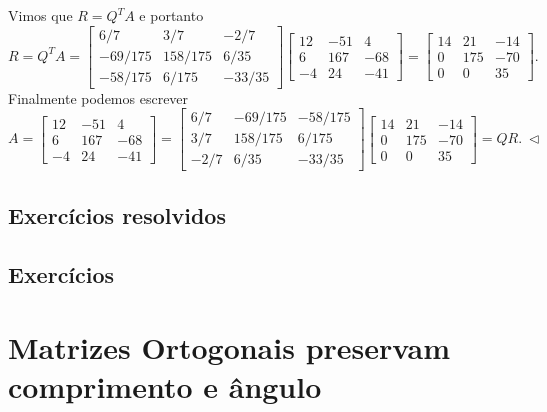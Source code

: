 \documentclass[../livro.tex]{subfiles}  %
\begin{document}
Vimos que $R=Q^T A$ e portanto
\begin{equation}
R = Q^T A =
\begin{bmatrix}
6/7 & 3/7 & -2/7 \\
-69/175 & 158/175 & 6/35   \\
-58/175& 6/175   &-33/35
\end{bmatrix}
\begin{bmatrix}
12 & -51 & 4 \\
6 & 167 & -68 \\
-4 & 24 & -41
\end{bmatrix} =
\begin{bmatrix}
14&21&-14\\
0&175&-70\\
0&0&35
\end{bmatrix} .
\end{equation} 
Finalmente podemos escrever
\begin{equation}
A =
\begin{bmatrix}
12 & -51 & 4 \\
6 & 167 & -68 \\
-4 & 24 & -41
\end{bmatrix} =
\begin{bmatrix}
6/7 & -69/175 & -58/175 \\
3/7 & 158/175 & 6/175   \\
-2/7& 6/35   &-33/35
\end{bmatrix}
\begin{bmatrix}
14&21&-14\\
0&175&-70\\
0&0&35
\end{bmatrix} = QR. \ \lhd
\end{equation}

\subsection*{Exercícios resolvidos}

\construirExeresol

\subsection*{Exercícios}

\construirExer

\section{Matrizes Ortogonais preservam comprimento e ângulo}
\end{document}
